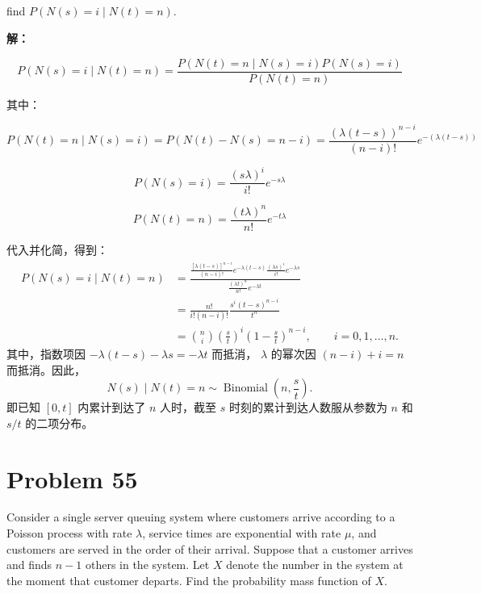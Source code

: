 \documentclass[12pt,a4paper]{article}
\begin{document}
\subsection{}

find $P(N(s)=i \mid N(t)=n)$.

\begin{answerbox}
\textbf{解：}

$$
P(N(s)=i \mid N(t)=n)  = \frac{P(N(t)=n \mid N(s)=i) P(N(s)=i) }{P(N(t)=n)}
$$

其中：

$$
P(N(t)=n \mid N(s)=i) = P(N(t)- N(s)=n-i)=\frac{(\lambda (t-s))^{n-i}}{(n-i)!}e^{-(\lambda (t-s))}
$$

$$
P(N(s)=i) = \frac{(s\lambda)^i}{i!}e^{-s\lambda}
$$

$$
P(N(t)=n)=\frac{(t\lambda)^n}{n!}e^{-t\lambda}
$$

代入并化简，得到：
$$
\begin{aligned}
P(N(s)=i\mid N(t)=n)
&=\frac{
\displaystyle\frac{[\lambda(t-s)]^{n-i}}{(n-i)!}e^{-\lambda(t-s)}
\displaystyle\frac{(\lambda s)^i}{i!}e^{-\lambda s}
}{\displaystyle\frac{(\lambda t)^n}{n!}e^{-\lambda t}}\\[6pt]
&=\frac{n!}{i!(n-i)!}\frac{s^i(t-s)^{n-i}}{t^n}\\[4pt]
&=\binom ni\left(\frac{s}{t}\right)^i
\left(1-\frac{s}{t}\right)^{n-i},\qquad i=0,1,\ldots,n.
\end{aligned}
$$
其中，指数项因 $-\lambda(t-s)-\lambda s=-\lambda t$ 而抵消，
$\lambda$ 的幂次因 $(n-i)+i=n$ 而抵消。因此，
$$
N(s)\mid N(t)=n\sim\operatorname{Binomial}\left(n,\frac{s}{t}\right).
$$
即已知 $[0,t]$ 内累计到达了 $n$ 人时，截至 $s$ 时刻的累计到达人数服从参数为 $n$ 和 $s/t$ 的二项分布。

\end{answerbox}

\section{Problem 55}

Consider a single server queuing system where customers arrive according to a Poisson process with rate $\lambda$, service times are exponential with rate $\mu$, and customers are served in the order of their arrival. Suppose that a customer arrives and finds $n-1$ others in the system. Let $X$ denote the number in the system at the moment that customer departs. Find the probability mass function of $X$.
\end{document}
